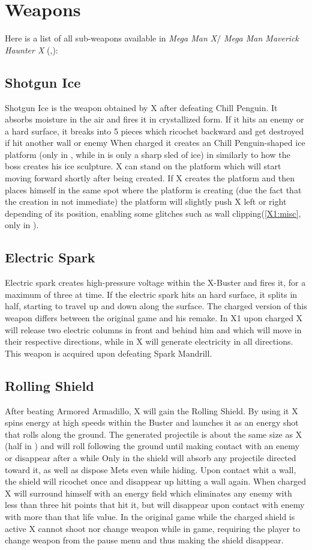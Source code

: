 \section{Weapons}\label{X1:sub_weapon}
Here is a list of all sub-weapons available in\textit{ Mega Man X}/ \textit{Mega Man Maverick Haunter X} (\cite{MHX:manual},\cite{wiki:X_weapons}):
\subsection{Shotgun Ice}
Shotgun Ice is the weapon obtained by X after defeating Chill Penguin. It absorbs moisture in the air and fires it in crystallized form. If it hits an enemy or a hard surface, it breaks into 5 pieces which ricochet backward and get destroyed if hit another wall or enemy When charged it creates an Chill Penguin-shaped ice platform (only in \x, while in \mhx is only a sharp sled of ice) in similarly to how the boss creates his ice sculpture. X can stand on the platform which will start moving forward shortly after being created. If X creates the platform and then places himself in the same spot where the platform is creating (due the fact that the creation in not immediate) the platform will slightly push X left or right depending of its position, enabling some glitches such as wall clipping(\ref{X1:misc}, only in \x).
\subsection{Electric Spark}
Electric spark creates high-pressure voltage within the X-Buster and fires it, for a maximum of three at time. If the electric spark hits an hard surface, it splits in half, starting to travel up and down along the surface. The charged version of this weapon differs between the original game and his remake. In X1 upon charged X will release two electric columns in front and behind him and which will move in their respective directions, while in \mhx X will generate electricity in all directions. This weapon is acquired upon defeating Spark Mandrill.
\subsection{Rolling Shield}
After beating Armored Armadillo, X will gain the Rolling Shield. By using it X spins energy at high speeds within the Buster and launches it	as an energy shot that rolls along the ground. The generated projectile is about the same size as X (half in \mhx) and will roll following the ground until making contact with an enemy or disappear after a while Only in \mhx the shield will absorb any projectile directed toward it, as well as dispose Mets even while hiding\cite{wiki:Rolling_shield}. Upon contact whit a wall, the shield will ricochet once and disappear up hitting a wall again. When charged X will surround himself with an energy field which eliminates any enemy with less than three hit points that hit it, but will disappear upon contact with enemy with more than that life value. In the original game while the charged shield is active X cannot shoot nor change weapon while in game, requiring the player to change weapon from the pause menu and thus making the shield disappear.
